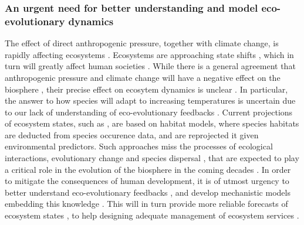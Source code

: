 \subsubsection*{An urgent need for better understanding and model eco-evolutionary dynamics}
The effect of direct anthropogenic pressure, together with climate change, is rapidly affecting ecosystems \cite{Ellis2011,Midgley2019}. Ecosystems are approaching state shifts \cite{Barnosky2011,Barnosky2012,Midgley2019}, which in turn will greatly affect human societies \cite{Mooney2009}.
%
% 
While there is a general agreement that anthropogenic pressure and climate change will have a negative effect on the biosphere \cite{fischlin2007ecosystems}, their precise effect on ecosytem dynamics is unclear \cite{Norberg2012}. In particular, the answer to how species will adapt to increasing temperatures is uncertain due to our lack of understanding of eco-evolutionary feedbacks \cite{Norberg2012}. 
% 
%
Current projections of ecosystem states, such as \cite{Midgley2019},
are based on habitat models, where species habitats are deducted from species occurence data, and are reprojected it given environmental predictors.
% 
Such approaches miss the processes of ecological interactions, evolutionary change and species dispersal \cite{Pearson2003}, that are expected to play a critical role in the evolution of the biosphere in the coming decades \cite{Norberg2012}.
% 
In order to mitigate the consequences of human development, it is of utmost urgency to better understand eco-evolutionary feedbacks \cite{Norberg2012}, and develop mechanistic models embedding this knowledge \cite{Urban2016}. This will in turn provide more reliable forecasts of ecosystem states \cite{Clark2001}, to help designing adequate management of ecosystem services \cite{Urban2016}.

